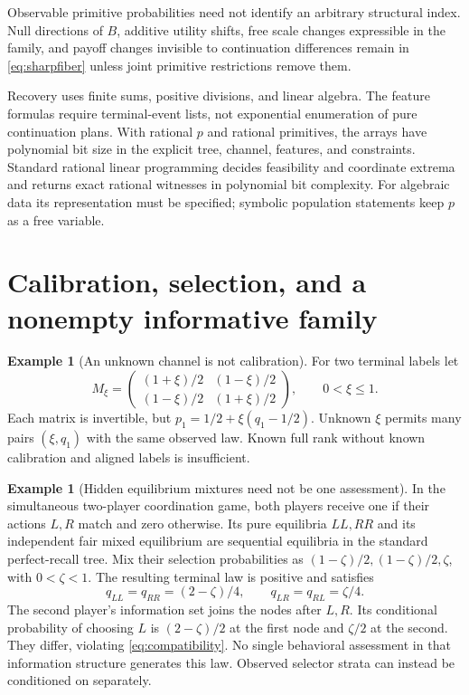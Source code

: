 \documentclass[11pt,a4paper]{article}
\numberwithin{equation}{section}
\theoremstyle{definition}
\newtheorem{example}[theorem]{Example}
\begin{document}
Observable primitive probabilities need not identify an arbitrary
structural index. Null directions of \(B\), additive utility shifts,
free scale changes expressible in the family, and payoff changes
invisible to continuation differences remain in \eqref{eq:sharpfiber}
unless joint primitive restrictions remove them.

Recovery uses finite sums, positive divisions, and linear algebra.
The feature formulas require terminal-event lists, not exponential
enumeration of pure continuation plans. With rational \(p\) and
rational primitives, the arrays have polynomial bit size in the
explicit tree, channel, features, and constraints. Standard rational
linear programming decides feasibility and coordinate extrema and
returns exact rational witnesses in polynomial bit complexity.
For algebraic data its representation must be specified; symbolic
population statements keep \(p\) as a free variable.

\section{Calibration, selection, and a nonempty informative family}
\label{sec:examples}
\begin{example}[An unknown channel is not calibration]
For two terminal labels let
\[
 M_\xi=
 \begin{pmatrix}(1+\xi)/2&(1-\xi)/2\\
                 (1-\xi)/2&(1+\xi)/2\end{pmatrix},
 \qquad 0<\xi\le1.
\]
Each matrix is invertible, but
\(p_1=1/2+\xi(q_1-1/2)\). Unknown \(\xi\) permits many pairs
\((\xi,q_1)\) with the same observed law. Known full rank without
known calibration and aligned labels is insufficient.
\end{example}

\begin{example}[Hidden equilibrium mixtures need not be one assessment]
In the simultaneous two-player coordination game, both players receive
one if their actions \(L,R\) match and zero otherwise. Its pure
equilibria \(LL,RR\) and its independent fair mixed equilibrium are
sequential equilibria in the standard perfect-recall tree.
Mix their selection probabilities as
\((1-\zeta)/2,(1-\zeta)/2,\zeta\), with \(0<\zeta<1\).
The resulting terminal law is positive and satisfies
\[
 q_{LL}=q_{RR}=(2-\zeta)/4,\qquad
 q_{LR}=q_{RL}=\zeta/4 .
\]
The second player's information set joins the nodes after \(L,R\).
Its conditional probability of choosing \(L\) is
\((2-\zeta)/2\) at the first node and \(\zeta/2\) at the second.
They differ, violating \eqref{eq:compatibility}. No single behavioral
assessment in that information structure generates this law.
Observed selector strata can instead be conditioned on separately.
\end{example}
\end{document}
